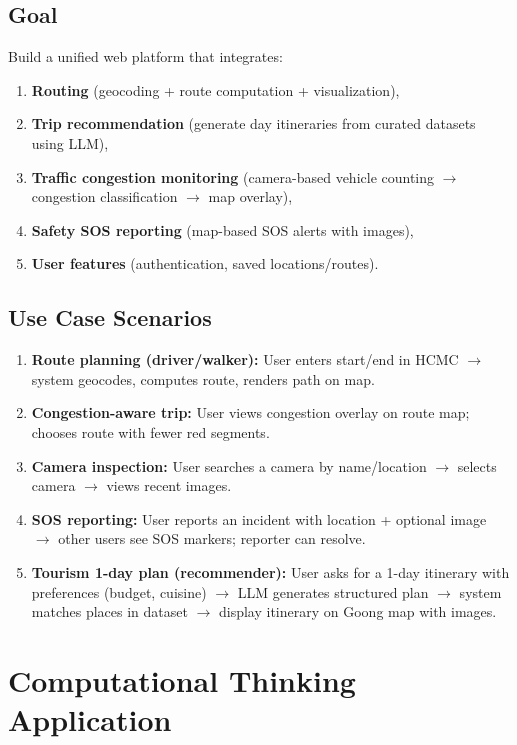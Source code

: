 \section{Goal}
Build a unified web platform that integrates:
\begin{enumerate}
  \item \textbf{Routing} (geocoding + route computation + visualization),
  \item \textbf{Trip recommendation} (generate day itineraries from curated datasets using LLM),
  \item \textbf{Traffic congestion monitoring} (camera-based vehicle counting $\rightarrow$ congestion classification $\rightarrow$ map overlay),
  \item \textbf{Safety SOS reporting} (map-based SOS alerts with images),
  \item \textbf{User features} (authentication, saved locations/routes).
\end{enumerate}

\section{Use Case Scenarios}
\begin{enumerate}
  \item \textbf{Route planning (driver/walker):} User enters start/end in HCMC $\rightarrow$ system geocodes, computes route, renders path on map.
  \item \textbf{Congestion-aware trip:} User views congestion overlay on route map; chooses route with fewer red segments.
  \item \textbf{Camera inspection:} User searches a camera by name/location $\rightarrow$ selects camera $\rightarrow$ views recent images.
  \item \textbf{SOS reporting:} User reports an incident with location + optional image $\rightarrow$ other users see SOS markers; reporter can resolve.
  \item \textbf{Tourism 1-day plan (recommender):} User asks for a 1-day itinerary with preferences (budget, cuisine) $\rightarrow$ LLM generates structured plan $\rightarrow$ system matches places in dataset $\rightarrow$ display itinerary on Goong map with images.
\end{enumerate}

\chapter{Computational Thinking Application}
\label{chap:ct}

